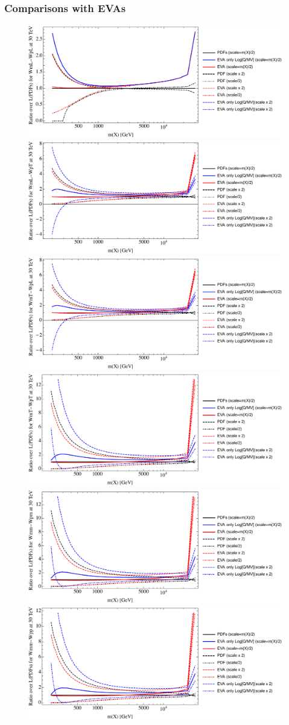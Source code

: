 \documentclass[a4paper,11pt]{article}
\begin{document}
\clearpage
\subsubsection{Comparisons with EVAs}


\begin{figure}[ht]
\includegraphics[width=0.46\linewidth]{PlotLumi/30TeV/ratios/WmL-WpL.pdf}
\includegraphics[width=0.46\linewidth]{PlotLumi/30TeV/ratios/WmL-WpT.pdf}
\includegraphics[width=0.46\linewidth]{PlotLumi/30TeV/ratios/WmT-WpL.pdf}
\includegraphics[width=0.46\linewidth]{PlotLumi/30TeV/ratios/WmT-WpT.pdf}
\includegraphics[width=0.46\linewidth]{PlotLumi/30TeV/ratios/Wmm-Wpm.pdf}
\includegraphics[width=0.46\linewidth]{PlotLumi/30TeV/ratios/Wmm-Wpp.pdf}
\end{figure}
\end{document}
